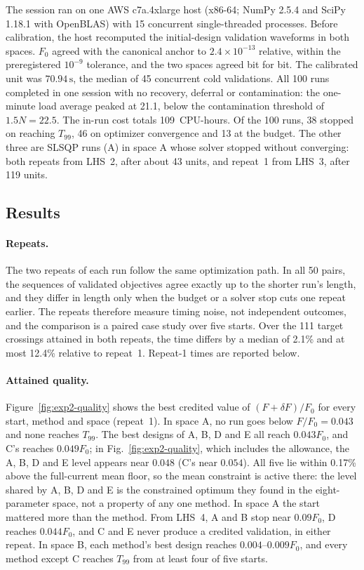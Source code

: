 The session ran on one AWS c7a.4xlarge host (x86-64; NumPy 2.5.4 and
SciPy 1.18.1 with OpenBLAS) with 15 concurrent single-threaded processes.
Before calibration, the host recomputed the initial-design validation
waveforms in both spaces. $F_0$ agreed with the canonical anchor to
$2.4\times10^{-13}$ relative, within the preregistered $10^{-9}$ tolerance,
and the two spaces agreed bit for bit. The calibrated unit was
$70.94\,\mathrm{s}$, the median of 45 concurrent cold validations. All 100
runs completed in one session with no recovery, deferral or contamination:
the one-minute load average peaked at 21.1, below the contamination
threshold of $1.5N=22.5$. The in-run cost totals 109~CPU-hours. Of the
100 runs, 38 stopped on reaching $T_{99}$, 46 on optimizer convergence and
13 at the budget. The other three are SLSQP runs (A) in space A whose
solver stopped without converging: both repeats from LHS~2, after about 43
units, and repeat~1 from LHS~3, after 119 units.

\subsection{Results}
\paragraph{Repeats.}
The two repeats of each run follow the same optimization path. In all 50
pairs, the sequences of validated objectives agree exactly up to the
shorter run's length, and they differ in length only when the budget or a
solver stop cuts one repeat earlier. The repeats therefore measure timing
noise, not independent outcomes, and the comparison is a paired case study
over five starts. Over the 111 target crossings attained in both repeats,
the time differs by a median of 2.1\% and at most 12.4\% relative to
repeat~1. Repeat-1 times are reported below.

\paragraph{Attained quality.}
Figure~\ref{fig:exp2-quality} shows the best credited value of
$(F+\delta F)/F_0$ for every start, method and space (repeat~1).
In space A, no run goes below $F/F_0=0.043$ and none reaches $T_{99}$.
The best designs of A, B, D and E all reach $0.043F_0$, and C's reaches
$0.049F_0$; in Fig.~\ref{fig:exp2-quality}, which includes the allowance,
the A, B, D and E level appears near $0.048$ (C's near $0.054$). All five lie within 0.17\% above the
full-current mean floor, so the mean constraint is active there: the level
shared by A, B, D and E is the constrained optimum they found in the
eight-parameter space,
not a property of any one method. In space A the start mattered more than
the method. From LHS~4, A and B stop near $0.09F_0$, D reaches $0.044F_0$,
and C and E never produce a credited validation, in either repeat. In
space B, each method's best design reaches $0.004$--$0.009F_0$, and every
method except C reaches $T_{99}$ from at least four of five starts.

